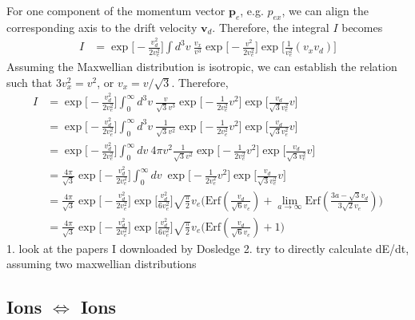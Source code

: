 \documentclass{article}
\begin{document}
For one component of the momentum vector $\bm{p}_e$, e.g. $p_{ex}$, we can align the corresponding axis to the drift velocity $\bm{v}_d$. Therefore, the integral $I$ becomes
\begin{equation}
	\begin{split}
		I &=\exp\Big[-\frac{v_d^2}{2v_e^2} \Big] \int d^3v\ \frac{v_x}{v^3} \exp\Big[-\frac{v^2}{2v_e^2} \Big] \exp\Big[\frac{1}{v_e^2}(v_x v_d ) \Big]
	\end{split}
\end{equation}
Assuming the Maxwellian distribution is isotropic, we can establish the relation such that $3v_x^2 = v^2$, or $v_x = v/ \sqrt{3}$. Therefore,
\begin{equation}
	\begin{split}
		I &= \exp\Big[-\frac{v_d^2}{2v_e^2} \Big] \int_0^\infty d^3v\ \frac{v}{\sqrt{3} v^3} \exp\Big[-\frac{1}{2v_e^2}v^2 \Big] \exp\Big[\frac{v_d}{\sqrt{3} v_e^2}v \Big] \\
		&= \exp\Big[-\frac{v_d^2}{2v_e^2} \Big] \int_0^\infty d^3v\ \frac{1}{\sqrt{3} v^2} \exp\Big[-\frac{1}{2v_e^2}v^2 \Big] \exp\Big[\frac{v_d}{\sqrt{3} v_e^2}v \Big] \\
		&= \exp\Big[-\frac{v_d^2}{2v_e^2} \Big] \int_0^\infty dv\ 4\pi v^2 \frac{1}{\sqrt{3} v^2} \exp\Big[-\frac{1}{2v_e^2}v^2 \Big] \exp\Big[\frac{v_d}{\sqrt{3} v_e^2}v \Big] \\
		&= \frac{4\pi}{\sqrt{3}} \exp\Big[-\frac{v_d^2}{2v_e^2} \Big] \int_0^\infty dv\ \exp\Big[-\frac{1}{2v_e^2}v^2 \Big] \exp\Big[\frac{v_d}{\sqrt{3} v_e^2}v \Big] \\
		&= \frac{4\pi}{\sqrt{3}} \exp\Big[-\frac{v_d^2}{2v_e^2} \Big] \exp\Big[\frac{v_d^2}{6v_e^2} \Big]\sqrt{\frac{\pi}{2}}v_e \Big(\text{Erf}(\frac{v_d}{\sqrt{6}v_e} ) + \lim_{a\to \infty} \text{Erf}(\frac{3a - \sqrt{3}v_d}{3\sqrt{2}v_e} )  \Big) \\
		&= \frac{4\pi}{\sqrt{3}} \exp\Big[-\frac{v_d^2}{2v_e^2} \Big] \exp\Big[\frac{v_d^2}{6v_e^2} \Big]\sqrt{\frac{\pi}{2}}v_e \Big(\text{Erf}(\frac{v_d}{\sqrt{6}v_e} ) + 1 \Big)
	\end{split}
\end{equation}
1. look at the papers I downloaded by Dosledge 2. try to directly calculate dE/dt, assuming two maxwellian distributions


\subsection{Ions $\Longleftrightarrow$ Ions}
\end{document}
